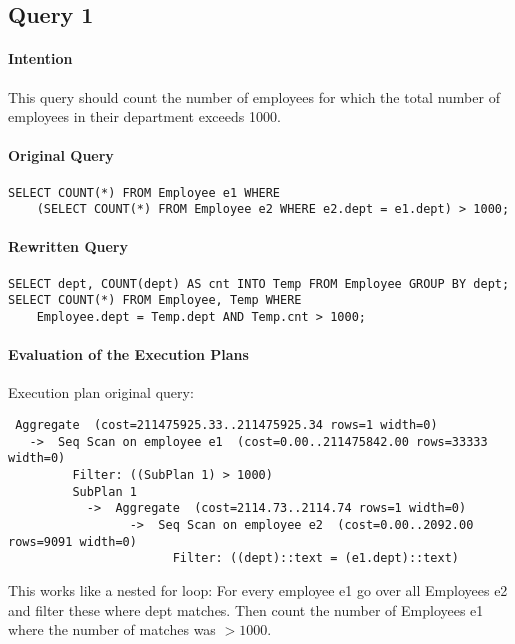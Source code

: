 \documentclass[11pt]{scrartcl}
\begin{document}
\subsection*{Query 1}

\paragraph{Intention}

This query should count the number of employees for which the total
number of employees in their department exceeds 1000.

\paragraph{Original Query}

{\small
\begin{verbatim}
SELECT COUNT(*) FROM Employee e1 WHERE
    (SELECT COUNT(*) FROM Employee e2 WHERE e2.dept = e1.dept) > 1000;
\end{verbatim}
}

\paragraph{Rewritten Query}

{\small
\begin{verbatim}
SELECT dept, COUNT(dept) AS cnt INTO Temp FROM Employee GROUP BY dept;
SELECT COUNT(*) FROM Employee, Temp WHERE
    Employee.dept = Temp.dept AND Temp.cnt > 1000;
\end{verbatim}
}

\paragraph{Evaluation of the Execution Plans}

Execution plan original query:

\begin{verbatim}
 Aggregate  (cost=211475925.33..211475925.34 rows=1 width=0)
   ->  Seq Scan on employee e1  (cost=0.00..211475842.00 rows=33333 width=0)
         Filter: ((SubPlan 1) > 1000)
         SubPlan 1
           ->  Aggregate  (cost=2114.73..2114.74 rows=1 width=0)
                 ->  Seq Scan on employee e2  (cost=0.00..2092.00 rows=9091 width=0)
                       Filter: ((dept)::text = (e1.dept)::text)
\end{verbatim}

This works like a nested for loop: For every employee e1 go over all Employees e2
and filter these where dept matches. Then count the number of Employees e1 where
the number of matches was $>1000$.
\end{document}
